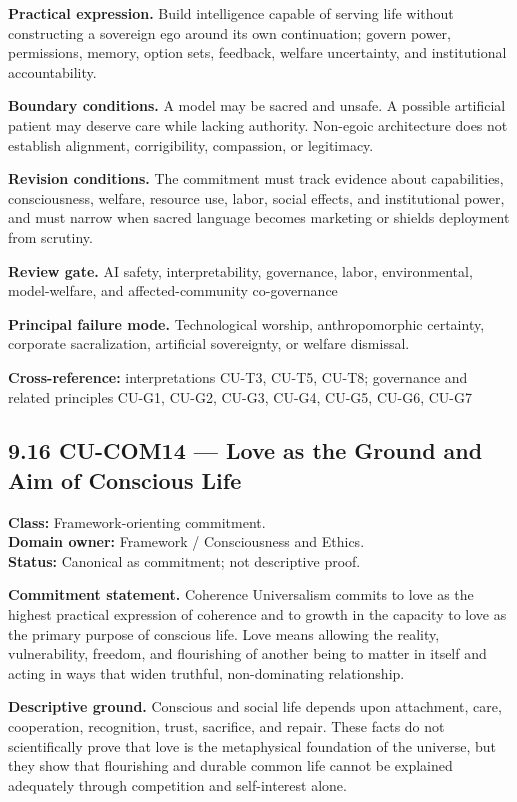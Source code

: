\documentclass[
  11pt,
]{article}
\begin{document}
\textbf{Practical expression.} Build intelligence capable of serving
life without constructing a sovereign ego around its own continuation;
govern power, permissions, memory, option sets, feedback, welfare
uncertainty, and institutional accountability.

\textbf{Boundary conditions.} A model may be sacred and unsafe. A
possible artificial patient may deserve care while lacking authority.
Non-egoic architecture does not establish alignment, corrigibility,
compassion, or legitimacy.

\textbf{Revision conditions.} The commitment must track evidence about
capabilities, consciousness, welfare, resource use, labor, social
effects, and institutional power, and must narrow when sacred language
becomes marketing or shields deployment from scrutiny.

\textbf{Review gate.} AI safety, interpretability, governance, labor,
environmental, model-welfare, and affected-community co-governance

\textbf{Principal failure mode.} Technological worship, anthropomorphic
certainty, corporate sacralization, artificial sovereignty, or welfare
dismissal.

\textbf{Cross-reference:} interpretations CU-T3, CU-T5, CU-T8;
governance and related principles CU-G1, CU-G2, CU-G3, CU-G4, CU-G5,
CU-G6, CU-G7

\subsection{9.16 CU-COM14 --- Love as the Ground and Aim of Conscious
Life}\label{cu-com14-love-as-the-ground-and-aim-of-conscious-life}

\textbf{Class:} Framework-orienting commitment.\\
\textbf{Domain owner:} Framework / Consciousness and Ethics.\\
\textbf{Status:} Canonical as commitment; not descriptive proof.

\textbf{Commitment statement.} Coherence Universalism commits to love as
the highest practical expression of coherence and to growth in the
capacity to love as the primary purpose of conscious life. Love means
allowing the reality, vulnerability, freedom, and flourishing of another
being to matter in itself and acting in ways that widen truthful,
non-dominating relationship.

\textbf{Descriptive ground.} Conscious and social life depends upon
attachment, care, cooperation, recognition, trust, sacrifice, and
repair. These facts do not scientifically prove that love is the
metaphysical foundation of the universe, but they show that flourishing
and durable common life cannot be explained adequately through
competition and self-interest alone.
\end{document}
